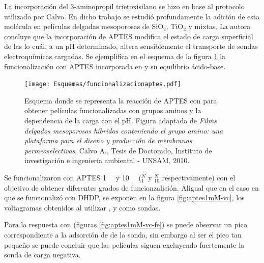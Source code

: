 			La incorporación del 3-aminopropil trietoxisilano se hizo en base al protocolo utilizado por Calvo\cite{Calvo20210}. En dicho trabajo se estudió profundamente la adición de esta molécula en películas delgadas mesoporosas de SiO$_2$, TiO$_2$ y mixtas. La autora concluye que la incorporación de APTES modifica el estado de carga superficial de las \pdm\space lo cuál, a un pH determinado, altera sensiblemente el transporte de sondas electroquímicas cargadas. Se ejemplifica en el esquema de la figura \ref{esq:aptes-esquema} la funcionalización con APTES incorporada en \pdmZ\space y su equilibrio ácido-base.

				 \begin{figure}[ht!]	
					\centering
			 	    \texttt{[image: Esquemas/funcionalizacionaptes.pdf]}
			        \caption[Funcionalización con APTES 1mM]{Esquema donde se representa la reacción de APTES con \pdmZ\space para obtener películas funcionalizadas con grupos aminos y la dependencia de la carga con el pH. Figura adaptada de \textit{Films delgados mesoporosos híbridos conteniendo el grupo amino: una plataforma para el diseño y producción de membranas permeoselectivas}, Calvo A., Tesis de Doctorado, Instituto de investigación e ingeniería ambiental - UNSAM, 2010.\cite{Calvo20210}}
			        \label{esq:aptes-esquema}
			      	\end{figure}

			\vspace*{3mm}Se funcionalizaron \pdmZ\space con APTES \SI{1}{\milli\Molar} y \SI{10}{\milli\Molar} (\pdmZ$^N_{1}$ y \pdmZ$^N_{10}$ respectivamente) con el objetivo de obtener diferentes grados de funcionzalición\cite{Calvo20210,Angelome2008,Fuertes2010}. Al\space igual que en el caso en que se funcionalizó con DHDP, se exponen en la figura \ref{fig:aptes1mM-vc}, los voltagramas obtenidos al utilizar \fe, \fc\space y \ru\space como sondas.

			Para la respuesta con \fe\space (figuras \ref{fig:aptes1mM-vc-fe}) se puede observar un pico correspondiente a la adsorción de de la sonda, sin embargo al ser el pico tan pequeño se puede concluir que las películas siguen excluyendo fuertemente la sonda de carga negativa.

